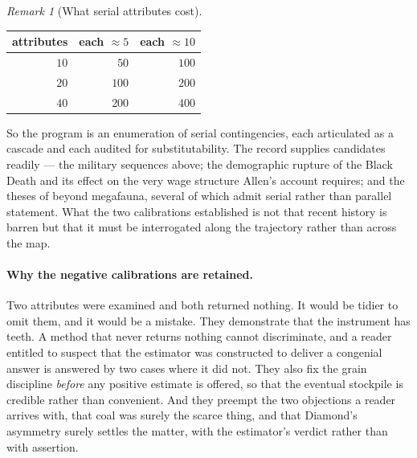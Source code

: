 \documentclass[11pt]{article}
\numberwithin{equation}{section}
\theoremstyle{plain}
\theoremstyle{definition}
\theoremstyle{remark}
\newtheorem{remark}[theorem]{Remark}
\begin{document}
\begin{remark}[What serial attributes cost]
\begin{center}\small
\begin{tabular}{@{}rrr@{}}
\toprule
attributes & each $\approx5$ & each $\approx10$\\
\midrule
$10$ & $50$ & $100$\\
$20$ & $100$ & $200$\\
$40$ & $200$ & $400$\\
\bottomrule
\end{tabular}
\end{center}

\noindent So the program is an enumeration of serial contingencies,
each articulated as a cascade and each audited for substitutability. The
record supplies candidates readily --- the military sequences above; the
demographic rupture of the Black Death and its effect on the very wage
structure Allen's account requires; and the theses of \cite{Diamond97}
beyond megafauna, several of which admit serial rather than parallel
statement. What the two calibrations established is not that recent
history is barren but that it must be interrogated along the trajectory
rather than across the map.

\paragraph{Why the negative calibrations are retained.}\label{gc:rem:whyretain}
Two attributes were examined and both returned nothing. It would be
tidier to omit them, and it would be a mistake. They demonstrate that the instrument has teeth. A method that never
returns nothing cannot discriminate, and a reader entitled to suspect
that the estimator was constructed to deliver a congenial answer is
answered by two cases where it did not. They also fix the grain
discipline \emph{before} any positive estimate is offered, so that the
eventual stockpile is credible rather than convenient. And they preempt
the two objections a reader arrives with, that coal was surely the
scarce thing, and that Diamond's asymmetry surely settles the matter, with the estimator's verdict rather than with assertion.


\end{remark}
\end{document}
